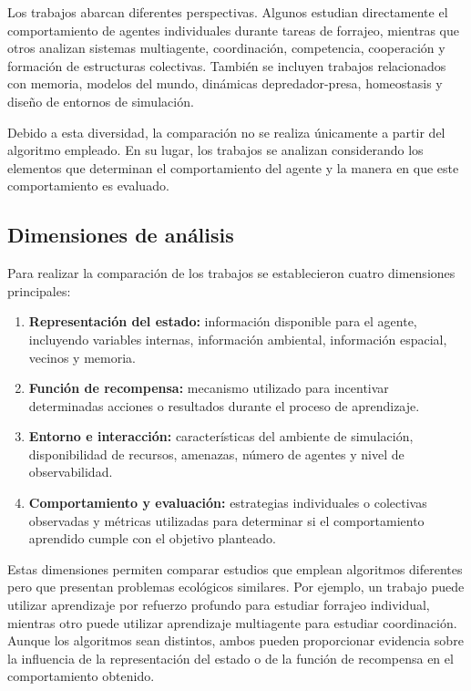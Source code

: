 \documentclass[conference]{IEEEtran}
\begin{document}
Los trabajos abarcan diferentes perspectivas. Algunos estudian
directamente el comportamiento de agentes individuales durante tareas de
forrajeo, mientras que otros analizan sistemas multiagente, coordinación,
competencia, cooperación y formación de estructuras colectivas. También
se incluyen trabajos relacionados con memoria, modelos del mundo,
dinámicas depredador-presa, homeostasis y diseño de entornos de
simulación.

Debido a esta diversidad, la comparación no se realiza únicamente a
partir del algoritmo empleado. En su lugar, los trabajos se analizan
considerando los elementos que determinan el comportamiento del agente y
la manera en que este comportamiento es evaluado.

\subsection{Dimensiones de análisis}

Para realizar la comparación de los trabajos se establecieron cuatro
dimensiones principales:

\begin{enumerate}

    \item \textbf{Representación del estado:} información disponible para
    el agente, incluyendo variables internas, información ambiental,
    información espacial, vecinos y memoria.

    \item \textbf{Función de recompensa:} mecanismo utilizado para
    incentivar determinadas acciones o resultados durante el proceso de
    aprendizaje.

    \item \textbf{Entorno e interacción:} características del ambiente de
    simulación, disponibilidad de recursos, amenazas, número de agentes
    y nivel de observabilidad.

    \item \textbf{Comportamiento y evaluación:} estrategias individuales
    o colectivas observadas y métricas utilizadas para determinar si el
    comportamiento aprendido cumple con el objetivo planteado.

\end{enumerate}

Estas dimensiones permiten comparar estudios que emplean algoritmos
diferentes pero que presentan problemas ecológicos similares. Por
ejemplo, un trabajo puede utilizar aprendizaje por refuerzo profundo para
estudiar forrajeo individual, mientras otro puede utilizar aprendizaje
multiagente para estudiar coordinación. Aunque los algoritmos sean
distintos, ambos pueden proporcionar evidencia sobre la influencia de la
representación del estado o de la función de recompensa en el
comportamiento obtenido.
\end{document}
